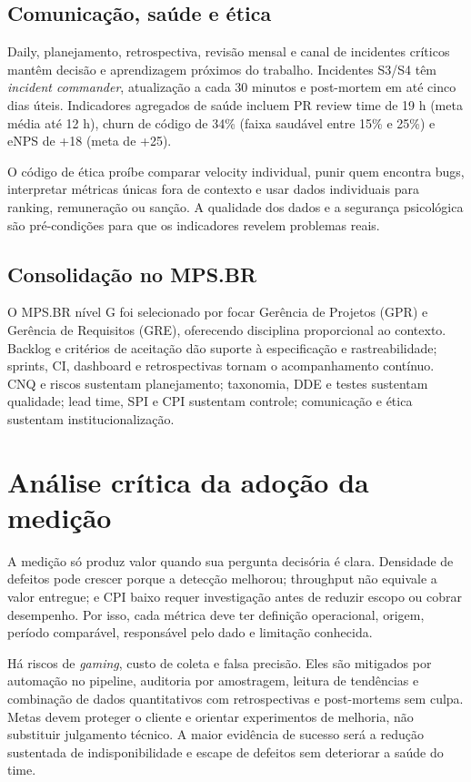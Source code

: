\documentclass[12pt,openright,oneside,a4paper,brazil]{abntex2}
\begin{document}
\section{Comunicação, saúde e ética}

Daily, planejamento, retrospectiva, revisão mensal e canal de incidentes críticos mantêm decisão e aprendizagem próximos do trabalho. Incidentes S3/S4 têm \textit{incident commander}, atualização a cada 30 minutos e post-mortem em até cinco dias úteis. Indicadores agregados de saúde incluem PR review time de 19 h (meta média até 12 h), churn de código de 34\% (faixa saudável entre 15\% e 25\%) e eNPS de +18 (meta de +25).

O código de ética proíbe comparar velocity individual, punir quem encontra bugs, interpretar métricas únicas fora de contexto e usar dados individuais para ranking, remuneração ou sanção. A qualidade dos dados e a segurança psicológica são pré-condições para que os indicadores revelem problemas reais.

\section{Consolidação no MPS.BR}

O MPS.BR nível G foi selecionado por focar Gerência de Projetos (GPR) e Gerência de Requisitos (GRE), oferecendo disciplina proporcional ao contexto. Backlog e critérios de aceitação dão suporte à especificação e rastreabilidade; sprints, CI, dashboard e retrospectivas tornam o acompanhamento contínuo. CNQ e riscos sustentam planejamento; taxonomia, DDE e testes sustentam qualidade; lead time, SPI e CPI sustentam controle; comunicação e ética sustentam institucionalização.

\chapter{Análise crítica da adoção da medição}

A medição só produz valor quando sua pergunta decisória é clara. Densidade de defeitos pode crescer porque a detecção melhorou; throughput não equivale a valor entregue; e CPI baixo requer investigação antes de reduzir escopo ou cobrar desempenho. Por isso, cada métrica deve ter definição operacional, origem, período comparável, responsável pelo dado e limitação conhecida.

Há riscos de \textit{gaming}, custo de coleta e falsa precisão. Eles são mitigados por automação no pipeline, auditoria por amostragem, leitura de tendências e combinação de dados quantitativos com retrospectivas e post-mortems sem culpa. Metas devem proteger o cliente e orientar experimentos de melhoria, não substituir julgamento técnico. A maior evidência de sucesso será a redução sustentada de indisponibilidade e escape de defeitos sem deteriorar a saúde do time.
\end{document}
